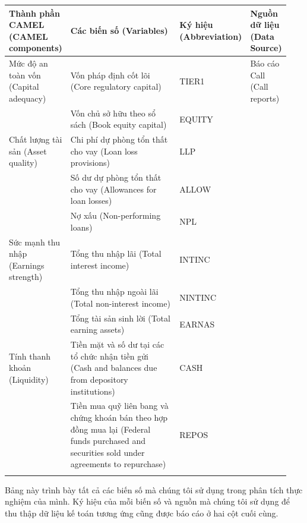 {\small
\begin{longtable}{>{\raggedright\arraybackslash}p{0.198\linewidth}>{\raggedright\arraybackslash}p{0.481\linewidth}>{\raggedright\arraybackslash}p{0.117\linewidth}>{\raggedright\arraybackslash}p{0.144\linewidth}}
\toprule
\textbf{Thành phần CAMEL (CAMEL components)} & \textbf{Các biến số (Variables)} & \textbf{Ký hiệu (Abbreviation)} & \textbf{Nguồn dữ liệu (Data Source)} \\
\midrule
\endhead
Mức độ an toàn vốn (Capital adequacy) & Vốn pháp định cốt lõi (Core regulatory capital) & TIER1 & Báo cáo Call (Call reports) \\
\addlinespace[2pt]
 & Vốn chủ sở hữu theo sổ sách (Book equity capital) & EQUITY &  \\
\addlinespace[2pt]
Chất lượng tài sản (Asset quality) & Chi phí dự phòng tổn thất cho vay (Loan loss provisions) & LLP &  \\
\addlinespace[2pt]
 & Số dư dự phòng tổn thất cho vay (Allowances for loan losses) & ALLOW &  \\
\addlinespace[2pt]
 & Nợ xấu (Non-performing loans) & NPL &  \\
\addlinespace[2pt]
Sức mạnh thu nhập (Earnings strength) & Tổng thu nhập lãi (Total interest income) & INTINC &  \\
\addlinespace[2pt]
 & Tổng thu nhập ngoài lãi (Total non-interest income) & NINTINC &  \\
\addlinespace[2pt]
 & Tổng tài sản sinh lời (Total earning assets) & EARNAS &  \\
\addlinespace[2pt]
Tính thanh khoản (Liquidity) & Tiền mặt và số dư tại các tổ chức nhận tiền gửi (Cash and balances due from depository institutions) & CASH &  \\
\addlinespace[2pt]
 & Tiền mua quỹ liên bang và chứng khoán bán theo hợp đồng mua lại (Federal funds purchased and securities sold under agreements to repurchase) & REPOS &  \\
\addlinespace[2pt]
\bottomrule
\end{longtable}
}

Bảng này trình bày tất cả các biến số mà chúng tôi sử dụng trong phân tích thực nghiệm của mình. Ký hiệu của mỗi biến số và nguồn mà chúng tôi sử dụng để thu thập dữ liệu kế toán tương ứng cũng được báo cáo ở hai cột cuối cùng.

